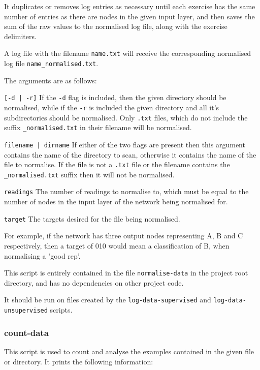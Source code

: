 \documentclass[a4paper]{article}
\begin{document}
It duplicates or removes log entries as necessary until each exercise has the same number of entries as there are nodes in the given input layer, and then saves the sum of the raw values to the normalised log file, along with the exercise delimiters.

A log file with the filename \lstinline{name.txt} will receive the corresponding normalised log file \lstinline{name_normalised.txt}.

The arguments are as follows:

\lstinline{[-d | -r]} If the \lstinline{-d} flag is included, then the given directory should be normalised, while if the \lstinline{-r} is included the given directory and all it's subdirectories should be normalised. Only \lstinline{.txt} files, which do not include the suffix \lstinline{_normalised.txt} in their filename will be normalised.

\lstinline{filename | dirname} If either of the two flags are present then this argument contains the name of the directory to scan, otherwise it contains the name of the file to normalise. If the file is not a \lstinline{.txt} file or the filename contains the \lstinline{_normalised.txt} suffix then it will not be normalised.

\lstinline{readings} The number of readings to normalise to, which must be equal to the number of nodes in the input layer of the network being normalised for.

\lstinline{target} The targets desired for the file being normalised.

For example, if the network has three output nodes representing A, B and C respectively, then a target of 010 would mean a classification of B, when normalising a 'good rep'.

This script is entirely contained in the file \lstinline{normalise-data} in the project root directory, and has no dependencies on other project code.

It should be run on files created by the \lstinline{log-data-supervised} and \lstinline{log-data-unsupervised} scripts.

\subsubsection{count-data}
\label{subsubsec:dc_csa_countdata}

This script is used to count and analyse the examples contained in the given file or directory. It prints the following information:
\end{document}
